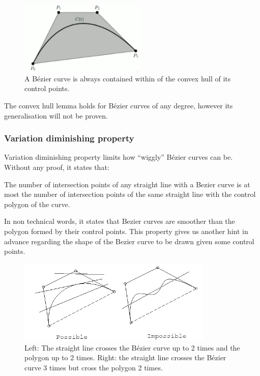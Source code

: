 \documentclass[a4paper]{article}
\begin{document}
\begin{figure}[H]
    \centering
    \includegraphics[height=3.5cm]{img/bezier/convex_hull_cubic.png}
    \caption{A B\'ezier curve is always contained within of the convex hull of its control points.}%
    \label{fig:}
\end{figure}
The convex hull lemma holds for B\'ezier curves of any degree, however its generalisation will not be proven.



\subsubsection{Variation diminishing property}

Variation diminishing property limits how ``wiggly'' B\'ezier curves can be. Without any proof, it states that:
\begin{lemma}
The number of  intersection points of any straight line with a Bezier curve is at most the number of intersection points of the same straight line with the control polygon of the curve.
\end{lemma}
In non technical words, it states that Bezier curves are smoother than the polygon formed by their control points. This property gives us another hint in advance regarding the shape of the Bezier curve to be drawn given some control points.

\begin{figure}[H]
    \centering
    \includegraphics[height=4cm]{img/bezier/variation_diminishing.png}
    \caption{Left: The straight line crosses the B\'ezier curve up to 2 times and the polygon up to 2 times. Right: the straight line crosses the B\'ezier curve 3 times but cross the polygon 2 times.}%
    \label{fig:}
\end{figure}
\end{document}
